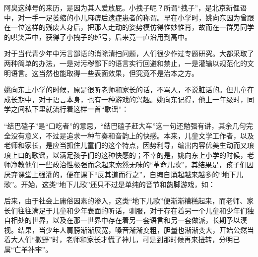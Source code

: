 \par 阿臭这绰号的来历，是因为其人爱放屁。小拽子呢？所谓“拽子”，是北京新俚语中，对一手一足萎缩的小儿麻痹后遗症患者的称谓。早在小学时，姚向东因为曾跟在一位这样的残废人身后，把那人走动的姿势模仿得惟妙惟肖，故而在一群男同学的哄笑声中，获得了小拽子的绰号，后来竟一直沿用到高中。
\par 对于当代青少年中污言鄙语的消除清扫问题，人们很少作过专题研究。大都采取了两种简单的办法，一是对污秽鄙下的语言实行回避和禁止，一是灌输以规范化的文明语言。这当然也能取得一些表面效果，但究竟不是治本之方。
\par 姚向东上小学的时候，原是很听老师和家长的话，不骂人，不说脏话的。但儿童在成长期中，对于语言本身，也有一种游戏的兴趣。姚向东记得，他上一年级时，同学之间私下里就流行着这样一首“歌谣”：
\par “结巴磕子”是“口吃者”的意思，“结巴磕子赶大车”这一句还勉强有讲，其余几句完全没有意义，不过是追求一种节奏和音韵上的快感。本来，儿童文学工作者，以及老师和家长，是应当抓住儿童们的这个特点，因势利导，编出内容优美生动而又琅琅上口的歌谣，以满足孩子们的这种快感的；不幸的是，姚向东上小学的时候，老师净教他们一些政治性极强而念起来索然无味的“革命儿歌”，其结果是，孩子们因厌弃课堂上强灌的，便在课下“反其道而行之”，自编自诵起越来越多的“地下儿歌”。开始，这类“地下儿歌”还只不过是单纯的音节和韵脚游戏，如：
\par 后来，由于社会上庸俗因素的渗入，这类“地下儿歌”便渐渐糟糕起来，而老师、家长们往往满足于儿童和少年表面的听话，驯服，对于存在着另一个儿童和少年们独自相处的世界，以及在那一世界中存在着另一套语言和另一套做派，长期予以漠视。结果，当少年人肩膀渐渐展宽，嗓音渐渐变粗，胆量也渐渐变大，开始公然当着大人们“撒野”时，老师和家长才慌了神儿，可是到那时候再来扭转，分明已属“亡羊补牢”。
